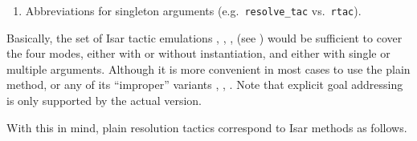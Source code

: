 \begin{isabellebody}
\begin{isamarkuptext}
\begin{enumerate}
  \item Abbreviations for singleton arguments (e.g.\ \verb|resolve_tac|
  vs.\ \verb|rtac|).

  \end{enumerate}

  Basically, the set of Isar tactic emulations \hyperlink{method.rule-tac}{\mbox{}},
  \hyperlink{method.erule-tac}{\mbox{}}, \hyperlink{method.drule-tac}{\mbox{}}, \hyperlink{method.frule-tac}{\mbox{}} (see
  ) would be sufficient to cover the four modes,
  either with or without instantiation, and either with single or
  multiple arguments.  Although it is more convenient in most cases to
  use the plain \hyperlink{method.Pure.rule}{\mbox{}} method, or any of its
  ``improper'' variants \hyperlink{method.erule}{\mbox{}}, \hyperlink{method.drule}{\mbox{}}, \hyperlink{method.frule}{\mbox{}}.  Note that explicit goal addressing is only supported by the
  actual \hyperlink{method.rule-tac}{\mbox{}} version.

  With this in mind, plain resolution tactics correspond to Isar
  methods as follows.


\end{isamarkuptext}
\end{isabellebody}
